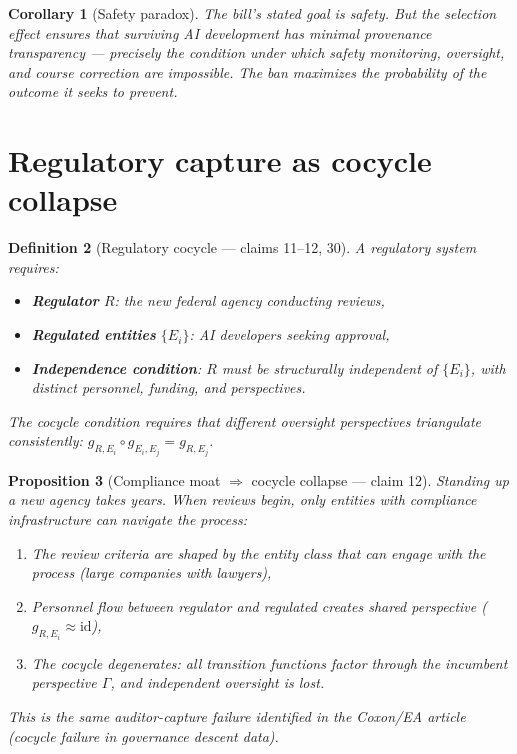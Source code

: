 \documentclass[11pt,a4paper]{article}
\newtheorem{definition}{Definition}[section]
\newtheorem{proposition}[definition]{Proposition}
\newtheorem{corollary}[definition]{Corollary}
\begin{document}
\begin{corollary}[Safety paradox]
The bill's stated goal is safety. But the selection effect ensures that
surviving AI development has minimal provenance transparency --- precisely
the condition under which safety monitoring, oversight, and course correction
are impossible. The ban maximizes the probability of the outcome it seeks
to prevent.
\end{corollary}

\section{Regulatory capture as cocycle collapse}
\label{sec:regulatory}

\begin{definition}[Regulatory cocycle --- claims 11--12, 30]
\label{def:reg-cocycle}
A regulatory system requires:
\begin{itemize}
\item \textbf{Regulator} $R$: the new federal agency conducting reviews,
\item \textbf{Regulated entities} $\{E_i\}$: AI developers seeking approval,
\item \textbf{Independence condition}: $R$ must be structurally independent
  of $\{E_i\}$, with distinct personnel, funding, and perspectives.
\end{itemize}
The cocycle condition requires that different oversight perspectives
triangulate consistently: $g_{R,E_i} \circ g_{E_i,E_j} = g_{R,E_j}$.
\end{definition}

\begin{proposition}[Compliance moat $\Rightarrow$ cocycle collapse --- claim 12]
\label{prop:moat}
Standing up a new agency takes years. When reviews begin, only entities
with compliance infrastructure can navigate the process:
\begin{enumerate}
\item The review criteria are shaped by the entity class that can engage
  with the process (large companies with lawyers),
\item Personnel flow between regulator and regulated creates shared
  perspective ($g_{R,E_i} \approx \text{id}$),
\item The cocycle degenerates: all transition functions factor through
  the incumbent perspective $\Gamma$, and independent oversight is lost.
\end{enumerate}
This is the same auditor-capture failure identified in the Coxon/EA
article (cocycle failure in governance descent data).
\end{proposition}
\end{document}

